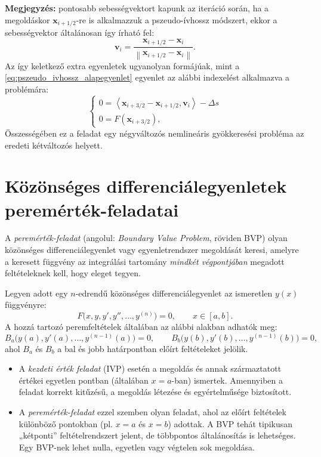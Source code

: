 \textbf{Megjegyzés:} pontosabb sebességvektort kapunk az iteráció során, ha a megoldáskor $\mathbf{x}_{i+1/2}$-re is alkalmazzuk a pszeudo-ívhossz módszert, ekkor a sebességvektor általánosan így írható fel:
\begin{equation}
\mathbf{v}_i = \frac{\mathbf{x}_{i+1/2} - \mathbf{x}_{i}}{\left \| \mathbf{x}_{i+1/2} - \mathbf{x}_{i} \right \|}.
\end{equation}
Az így keletkező extra egyenletek ugyanolyan formájúak, mint a \eqref{eq:pszeudo_ivhossz_alapegyenlet} egyenlet az alábbi indexelést alkalmazva a problémára:
\begin{equation}
\begin{cases}
0 = \left< \mathbf{x}_{i+3/2} - \mathbf{x}_{i+1/2}, \mathbf{v}_i \right> - \Delta s \\
0 = F(\mathbf{x}_{i+3/2}),
\end{cases}
\end{equation}
Összességében ez a feladat egy négyváltozós nemlineáris gyökkeresési probléma az eredeti kétváltozós helyett.


\section{Közönséges differenciálegyenletek peremérték-feladatai}

A \emph{peremérték-feladat} (angolul: \emph{Boundary Value Problem}, röviden BVP) olyan közönséges differenciálegyenlet vagy egyenletrendszer megoldását keresi, amelyre a keresett függvény az integrálási tartomány \emph{mindkét végpontjában} megadott feltételeknek kell, hogy eleget tegyen.

Legyen adott egy $n$-edrendű közönséges differenciálegyenlet az ismeretlen $y(x)$ függvényre:
\[
F\big(x, y, y', y'', \ldots, y^{(n)}\big) = 0, 
\qquad x \in [a,b].
\]
A hozzá tartozó peremfeltételek általában az alábbi alakban adhatók meg:
\[
B_a\big(y(a), y'(a), \ldots, y^{(n-1)}(a)\big) = 0,
\qquad
B_b\big(y(b), y'(b), \ldots, y^{(n-1)}(b)\big) = 0,
\]
ahol $B_a$ és $B_b$ a bal és jobb határpontban előírt feltételeket jelölik.

\begin{itemize}
\item A \emph{kezdeti érték feladat} (IVP) esetén a megoldás és annak származtatott értékei egyetlen pontban (általában $x=a$-ban) ismertek. Amennyiben a feladat korrekt kitűzésű, a megoldás létezése és egyértelműsége biztosított.
\item A \emph{peremérték-feladat} ezzel szemben olyan feladat, ahol az előírt feltételek különböző pontokban (pl. $x=a$ és $x=b$) adottak. A BVP tehát tipikusan „kétponti” feltételrendszert jelent, de többpontos általánosítás is lehetséges. Egy BVP-nek lehet nulla, egyetlen vagy végtelen sok megoldása.
\end{itemize}

